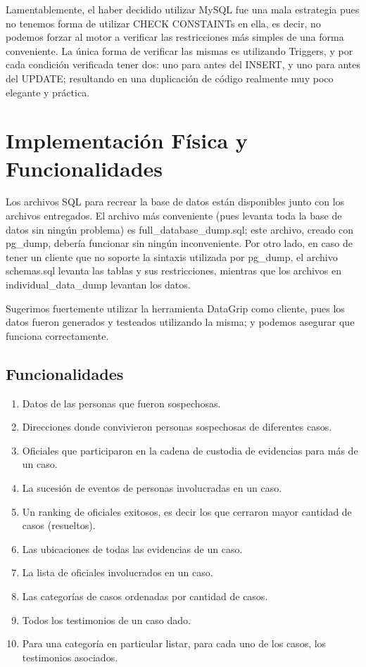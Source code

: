 \documentclass{article}
\theoremstyle{definition}
\theoremstyle{remark}
\begin{document}
Lamentablemente, el haber decidido utilizar MySQL fue una mala estrategia pues no tenemos forma de utilizar CHECK CONSTAINTs en ella, es decir, no podemos forzar al motor a verificar las restricciones más simples de una forma conveniente. La única forma de verificar las mismas es utilizando Triggers, y por cada condición verificada tener dos: uno para antes del INSERT, y uno para antes del UPDATE; resultando en una duplicación de código realmente muy poco elegante y práctica.

\pagebreak

\section{Implementación Física y Funcionalidades}

Los archivos SQL para recrear la base de datos están disponibles junto con los archivos entregados. El archivo más conveniente (pues levanta toda la base de datos sin ningún problema) es full\_database\_dump.sql; este archivo, creado con pg\_dump, debería funcionar sin ningún inconveniente. Por otro lado, en caso de tener un cliente que no soporte la sintaxis utilizada por pg\_dump, el archivo schemas.sql levanta las tablas y sus restricciones, mientras que los archivos en individual\_data\_dump levantan los datos.

Sugerimos fuertemente utilizar la herramienta DataGrip como cliente, pues los datos fueron generados y testeados utilizando la misma; y podemos asegurar que funciona correctamente.

\subsection{Funcionalidades}

\begin{enumerate}
    \item Datos de las personas que fueron sospechosas.
    \item Direcciones donde convivieron personas sospechosas de diferentes casos.
    \item Oficiales que participaron en la cadena de custodia de evidencias para más de un caso.
    \item La sucesión de eventos de personas involucradas en un caso.
    \item Un ranking de oficiales exitosos, es decir los que cerraron mayor cantidad de casos (resueltos).
    \item Las ubicaciones de todas las evidencias de un caso.
    \item La lista de oficiales involucrados en un caso.
    \item Las categorías de casos ordenadas por cantidad de casos.
    \item Todos los testimonios de un caso dado.
    \item Para una categoría en particular listar, para cada uno de los casos, los testimonios asociados.
\end{enumerate}
\end{document}
